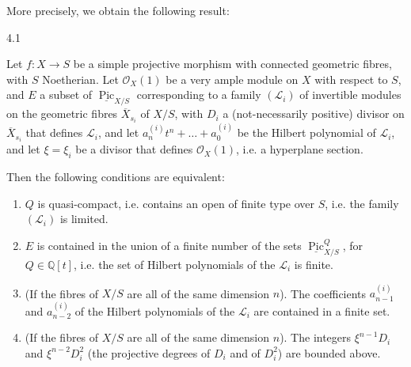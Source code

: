   More precisely, we obtain the following result:\begin{theorem}{4.1}\label{fga3.vi-4-theorem-4.1}\skipsinglepar\par{}Let \(f\colon  X\to  S\) be a simple projective morphism with connected geometric fibres, with \(S\) Noetherian.
    Let \(\mathcal {O}_X(1)\) be a very ample module on \(X\) with respect to \(S\), and \(E\) a subset of \(\underline {\operatorname {Pic}}_{X/S}\) corresponding to a family \((\mathscr {L}_i)\) of invertible modules on the geometric fibres \(\overline {X}_{s_i}\) of \(X/S\), with \(D_i\) a (not-necessarily positive) divisor on \(\overline {X}_{s_i}\) that defines \(\mathscr {L}_i\), and let \(a_n^{(i)}t^n+\ldots +a_0^{(i)}\) be the Hilbert polynomial of \(\mathscr {L}_i\), and let \(\xi =\xi _i\) be a divisor that defines \(\mathcal {O}_X(1)\), i.e. a hyperplane section.\par{}Then the following conditions are equivalent:\begin{enumerate}
    
 \item[a.]
      \(Q\) is quasi-compact, i.e. contains an open of finite type over \(S\), i.e. the family \((\mathscr {L}_i)\) is limited.
    

    
 \item[b.]
      \(E\) is contained in the union of a finite number of the sets \(\underline {\operatorname {Pic}}_{X/S}^Q\), for \(Q\in \mathbb {Q}[t]\), i.e. the set of Hilbert polynomials of the \(\mathscr {L}_i\) is finite.
    

    
 \item[b'.]
      (If the fibres of \(X/S\) are all of the same dimension \(n\)).
      The coefficients \(a_{n-1}^{(i)}\) and \(a_{n-2}^{(i)}\) of the Hilbert polynomials of the \(\mathscr {L}_i\) are contained in a finite set.
    

    
 \item[b''.]
      
      (If the fibres of \(X/S\) are all of the same dimension \(n\)).
      The integers \(\xi ^{n-1}D_i\) and \(\xi ^{n-2}D_i^2\) (the projective degrees of \(D_i\) and of \(D_i^2\)) are bounded above.
    


\end{enumerate}
\end{theorem}

